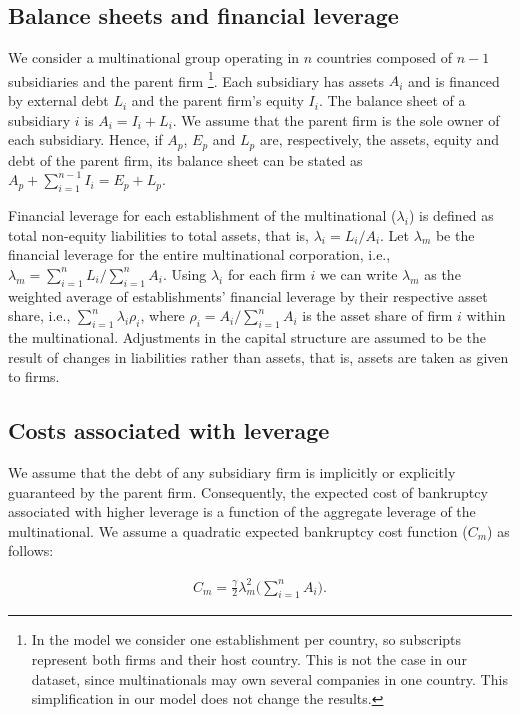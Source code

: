 \documentclass[12pt]{article}
\begin{document}
\subsection{Balance sheets and financial leverage}
	\label{subsec:balancesheet}
	We consider a multinational group operating in $n$ countries composed of $n-1$ subsidiaries and the parent firm \footnote{In the model we consider one establishment per country, so subscripts represent both firms and their host country. This is not the case in our dataset, since multinationals may own several companies in one country. This simplification in our model does not change the results.}. Each subsidiary has assets $A_i$ and is financed by external debt $L_i$ and the parent firm's equity $I_i$. The balance sheet of a subsidiary $i$ is $A_i=I_i+L_i$. We assume that the parent firm is the sole owner of each subsidiary. Hence, if $A_p$, $E_p$ and $L_p$ are, respectively, the assets, equity and debt of the parent firm, its balance sheet can be stated as $A_p+\sum_{i=1}^{n-1}I_i=E_p+L_p$. 

	Financial leverage for each establishment of the multinational ($\lambda_i$) is defined as total non-equity liabilities to total assets, that is,  $\lambda_i=L_i/A_i$. Let $\lambda_m$ be the financial leverage for the entire multinational corporation, i.e., $\lambda_m=\sum_{i=1}^{n}L_i/\sum_{i=1}^{n}A_i$. Using $\lambda_i$ for each firm $i$ we can write $\lambda_m$ as the weighted average of establishments' financial leverage by their respective asset share, i.e., $\sum_{i=1}^{n}\lambda_i\rho_i$, where $\rho_i=A_i/\sum_{i=1}^{n}A_i$ is the asset share of firm $i$ within the multinational. Adjustments in the capital structure are assumed to be the result of changes in liabilities rather than assets, that is, assets are taken as given to firms. 
	
	\subsection{Costs associated with leverage}
	\label{subsec:costs}
	We assume that the debt of any subsidiary firm is implicitly or explicitly guaranteed by the parent firm. Consequently, the expected cost of bankruptcy associated with higher leverage is  a function of the aggregate leverage of the multinational. We assume a quadratic expected bankruptcy cost function ($C_m$) as follows:
	
	\begin{equation}
	\begin{aligned}
	C_m=\frac{\gamma}{2}\lambda_m^2\bigg(\sum_{i=1}^{n}A_i\bigg).
	\end{aligned}
	\label{eq:cost bankruptcy}
	\end{equation}
	
\end{document}
